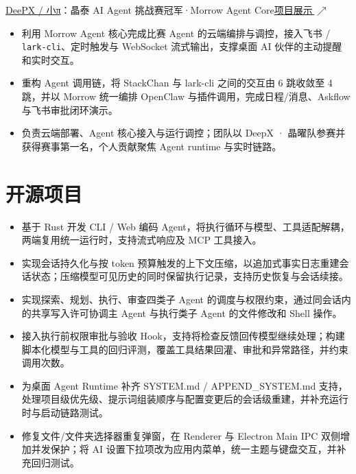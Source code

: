 \documentclass{resume}
\newcommand{\metainfo}[1]{{\fontsize{9.6}{13.7}\selectfont\color{muted}#1\par}\vspace{1.5pt}}
\newcommand{\projectlink}[2]{\href{#1}{\textcolor{muted}{#2}}}
\newcommand{\cvsection}[2]{\section{\texorpdfstring{\makebox[1.35em][l]{\normalfont #1}}{}#2}}
\begin{document}
\metainfo{\projectlink{https://github.com/catDforD/Morrow/tree/feat/robot-agent}{DeePX / 小π}：晶泰 AI Agent 挑战赛冠军\quad ·\quad Morrow Agent Core\quad\href{https://catdford.github.io/Morrow/deepx-robot-pitch.html}{\textcolor[HTML]{1F5EA8}{\underline{项目展示}\,\ensuremath{\nearrow}}}}
\begin{itemize}
  \item 利用 Morrow Agent 核心完成比赛 Agent 的云端编排与调控，接入飞书 / \texttt{lark-cli}、定时触发与 WebSocket 流式输出，支撑桌面 AI 伙伴的主动提醒和实时交互。
  \item 重构 Agent 调用链，将 StackChan 与 lark-cli 之间的交互由 6 跳收敛至 4 跳，并以 Morrow 统一编排 OpenClaw 与插件调用，完成日程/消息、Askflow 与飞书审批闭环演示。
  \item 负责云端部署、Agent 核心接入与运行调控；团队以 DeepX · 晶曜队参赛并获得赛事第一名，个人贡献聚焦 Agent runtime 与实时链路。
\end{itemize}

\cvsection{\faCode}{开源项目}
\begin{itemize}
  \item 基于 Rust 开发 CLI / Web 编码 Agent，将执行循环与模型、工具适配解耦，两端复用统一运行时，支持流式响应及 MCP 工具接入。
  \item 实现会话持久化与按 token 预算触发的上下文压缩，以追加式事实日志重建会话状态；压缩模型可见历史的同时保留执行记录，支持历史恢复与会话续接。
  \item 实现探索、规划、执行、审查四类子 Agent 的调度与权限约束，通过同会话内的共享写入许可协调主 Agent 与执行类子 Agent 的文件修改和 Shell 操作。
  \item 接入执行前权限审批与验收 Hook，支持将检查反馈回传模型继续处理；构建脚本化模型与工具的回归评测，覆盖工具结果回灌、审批和异常路径，并约束调用次数。
\end{itemize}

\begin{itemize}
  \item 为桌面 Agent Runtime 补齐 SYSTEM.md / APPEND\_SYSTEM.md 支持，处理项目级优先级、提示词组装顺序与配置变更后的会话级重建，并补充运行时与启动链路测试。
  \item 修复文件/文件夹选择器重复弹窗，在 Renderer 与 Electron Main IPC 双侧增加并发保护；将 AI 设置下拉项改为应用内菜单，统一主题与键盘交互，并补充回归测试。
\end{itemize}
\end{document}
